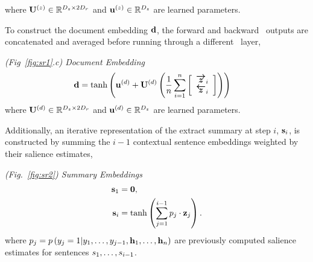 where $\mathbf{U}^{(z)} \in \mathbb{R}^{{D_z} \times 2{D_r}}$ and $\mathbf{u}^{(z)} \in \mathbb{R}^{{D_z}}$ are learned parameters.

To construct the document embedding $\mathbf{d}$, the forward and backward 
\gru~outputs are concatenated and averaged before running through a different 
\feedforward~layer,

\vspace{10pt}
\noindent\textit{(Fig~\ref{fig:sr1}.c) Document Embedding}
\begin{align}
\mathbf{d}  & = \tanh\left(\mathbf{u}^{(d)} + \mathbf{U}^{(d)} \left(\frac{1}{n}\sum_{i=1}^{n} \left[ \begin{array}{c} \boldsymbol{\overrightarrow{z}}_i \\ \boldsymbol{\overleftarrow{z}}_i  \end{array} \right] \right) \right)
\end{align}
where $\mathbf{U}^{(d)} \in \mathbb{R}^{{D_z} \times 2{D_r}}$ and $\mathbf{u}^{(d)} \in \mathbb{R}^{{D_z}}$ are learned parameters.

%





Additionally, an iterative representation of the extract summary at step $i$,
 $\mathbf{s}_i$, is constructed by summing the $i-1$ contextual sentence 
embeddings weighted by their salience estimates,

\vspace{10pt}
   \noindent \textit{(Fig.~\ref{fig:sr2}) Summary Embeddings}
\begin{align}
\mathbf{s}_1 & = \mathbf{0}, \\
\mathbf{s}_i & = \tanh\left(\sum_{j=1}^{i-1} p_j \cdot \mathbf{z}_j\right).
\end{align}
where $p_j= p\left(y_j=1|y_1,\ldots,y_{j-1},\mathbf{h}_1, \ldots, \mathbf{h}_n\right)$ are previously computed salience estimates for
sentences $s_1,\ldots,s_{i-1}$.

